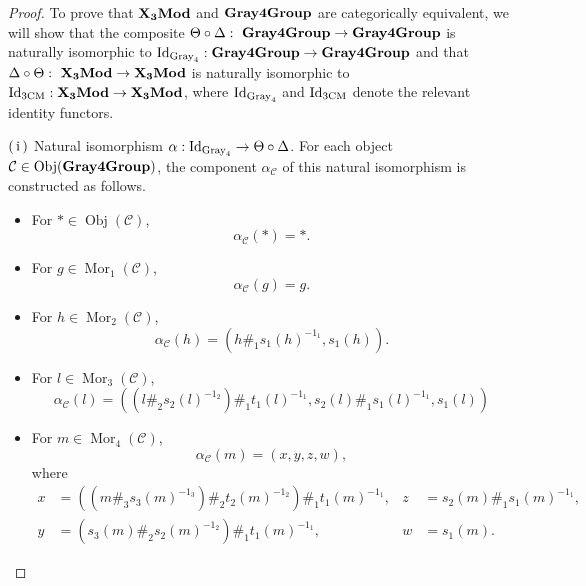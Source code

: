 \documentclass[11pt, reqno]{amsart} %
\newcommand{\obj}{{\mathop{\mathrm{Obj}}}}
\newcommand{\mor}{{\mathop{\mathrm{Mor}}}}
\newcommand{\TXMod}{{\bf X_3Mod}}
\newcommand{\Gray}{{\bf Gray4Group}}
\newcommand{\cC}{{\mathcal{C}}}
\theoremstyle{definition}
\theoremstyle{remark}
\numberwithin{equation}{section}
\begin{document}
\begin{proof}
To prove that $\TXMod$ and $\Gray$ are categorically equivalent, we will show that the composite $\Theta \circ \Delta:~\Gray\to\Gray$ is naturally isomorphic to ${\rm Id}_{\text{Gray}_4} : \Gray \to \Gray$ and that $\Delta \circ \Theta:~\TXMod \to \TXMod$ is naturally isomorphic to ${\rm Id}_{\text{3CM}} : \TXMod \to \TXMod$, where ${\rm Id}_{\text{Gray}_4}$ and ${\rm Id}_{\text{3CM}}$ denote the relevant identity functors.

\vspace{.5em}
\noindent
$\rm(\hspace{.18em}i\hspace{.18em})$ Natural isomorphism $\alpha : {\rm Id}_{\text{Gray}_4} \to \Theta \circ \Delta$.
For each object $\cC \in \obj(\Gray)$, the component $\alpha_{\cC}$ of this natural isomorphism is constructed as follows.
\begin{itemize}
  \item For $* \in \obj(\cC)$, 
  \[
  \alpha_\cC (*) = *.
  \]
  \item For $ g \in \mor_1(\cC)$, 
  \[
  \alpha_\cC (g) = g.
  \]
  \item For $ h \in \mor_2(\cC)$, 
  \[
  \alpha_\cC (h) = \left(h \#_1 s_1(h)^{-1_1}, s_1(h)\right).
  \]
  \item For $ l \in \mor_3(\cC)$, 
  \[
  \alpha_\cC (l) = \left(\left(l \#_2 s_2(l)^{-1_2}\right)\#_1 t_1(l)^{-1_1},s_2(l) \#_1 s_1(l)^{-1_1},s_1(l)\right)
  \]
  \item For $ m \in \mor_4(\cC)$, 
  \[
  \alpha_\cC (m) = (x,y,z,w),
  \]
  where
  \begin{align*}
    x &= \left(\left(m \#_3 s_3(m)^{-1_3} \right) \#_2 t_2(m)^{-1_2}\right) \#_1 t_1(m)^{-1_1}, & z &= s_2(m) \#_1 s_1(m)^{-1_1}, \\ y &= \left(s_3(m) \#_2 s_2(m)^{-1_2}\right)\#_1 t_1(m)^{-1_1}, & w &= s_1(m).
  \end{align*}
\end{itemize}


\end{proof}
\end{document}

